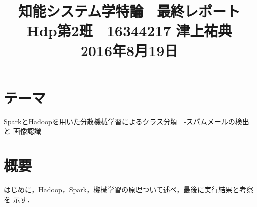 \documentclass[a4paper,12pt]{jarticle}
\begin{document}
%
\title{\vspace{-30mm}知能システム学特論 \ 最終レポート\\ Hdp第2班　16344217 津上祐典\\ 2016年8月19日}
\date{}
%
%
\maketitle
%
\vspace{-30mm}
%
 \section{テーマ}
SparkとHadoopを用いた分散機械学習によるクラス分類　-スパムメールの検出と
画像認識
\section{概要}
はじめに，Hadoop，Spark，機械学習の原理ついて述べ，最後に実行結果と考察を
示す．
\end{document}
